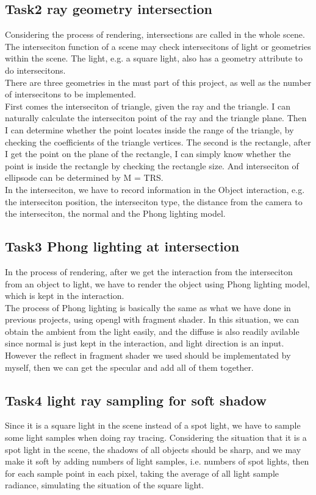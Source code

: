 \documentclass[acmtog]{acmart}
\begin{document}
\subsection{Task2 ray geometry intersection}
Considering the process of rendering, intersections are called in the whole scene. The interseciton function of a scene may check intersecitons of light or geometries within the scene. The light, e.g. a square light, also has a geometry attribute to do intersecitons.\\
There are three geometries in the must part of this project, as well as the number of intersecitons to be implemented.\\
First comes the interseciton of triangle, given the ray and the triangle. I can naturally calculate the interseciton point of the ray and the triangle plane. Then I can determine whether the point locates inside the range of the triangle, by checking the coefficients of the triangle vertices. The second is the rectangle, after I get the point on the plane of the rectangle, I can simply know whether the point is inside the rectangle by checking the rectangle size.
And interseciton of ellipsode can be determined by M = TRS.\\
In the interseciton, we have to record information in the Object interaction, e.g. the interseciton position, the interseciton type, the distance from the camera to the interseciton, the normal and the Phong lighting model.
\subsection{Task3 Phong lighting at intersection}
In the process of rendering, after we get the interaction from the interseciton from an object to light, we have to render the object using Phong lighting model, which is kept in the interaction.\\
The process of Phong lighting is basically the same as what we have done in previous projects, using opengl with fragment shader. In this situation, we can obtain the ambient from the light easily, and the diffuse is also readily avilable since normal is just kept in the interaction, and light direction is an input.
However the reflect in fragment shader we used should be implementated by myself, then we can get the specular and add all of them together.
\subsection{Task4 light ray sampling for soft shadow}
Since it is a square light in the scene instead of a spot light, we have to sample some light samples when doing ray tracing. Considering the situation that it is a spot light in the scene, the shadows of all objects should be sharp, and we may make it soft by adding numbers of light samples, i.e. numbers of spot lights, then for each sample point in each pixel, taking the average of all light sample radiance, simulating the situation of the square light.
\end{document}
